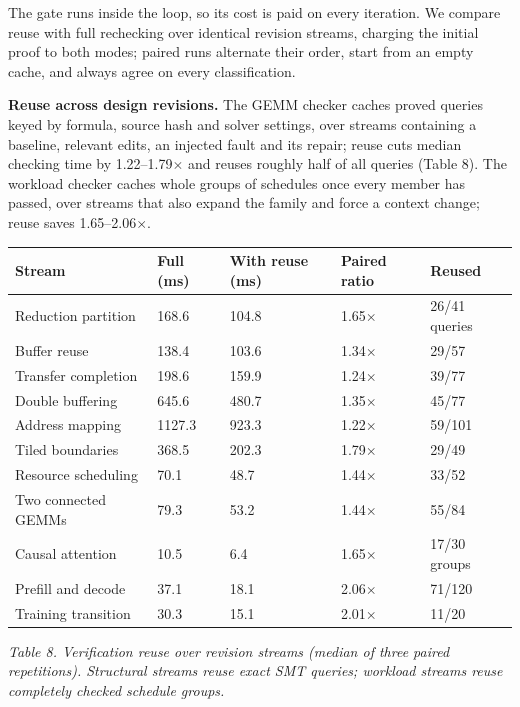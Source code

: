 \documentclass[11pt]{article}
\begin{document}
The gate runs inside the loop, so its cost is paid on every iteration. We compare reuse with full rechecking over identical revision streams, charging the initial proof to both modes; paired runs alternate their order, start from an empty cache, and always agree on every classification.

\textbf{Reuse across design revisions.} The GEMM checker caches proved queries keyed by formula, source hash and solver settings, over streams containing a baseline, relevant edits, an injected fault and its repair; reuse cuts median checking time by 1.22--1.79\ensuremath{\times} and reuses roughly half of all queries (Table 8). The workload checker caches whole groups of schedules once every member has passed, over streams that also expand the family and force a context change; reuse saves 1.65--2.06\ensuremath{\times}.

\begin{longtable}[]{@{}lllll@{}}
\toprule\noalign{}
Stream & Full (ms) & With reuse (ms) & Paired ratio & Reused \\
\midrule\noalign{}
\endhead
\bottomrule\noalign{}
\endlastfoot
Reduction partition & 168.6 & 104.8 & 1.65\(\times\) & 26/41 queries \\
Buffer reuse & 138.4 & 103.6 & 1.34\(\times\) & 29/57 \\
Transfer completion & 198.6 & 159.9 & 1.24\(\times\) & 39/77 \\
Double buffering & 645.6 & 480.7 & 1.35\(\times\) & 45/77 \\
Address mapping & 1127.3 & 923.3 & 1.22\(\times\) & 59/101 \\
Tiled boundaries & 368.5 & 202.3 & 1.79\(\times\) & 29/49 \\
Resource scheduling & 70.1 & 48.7 & 1.44\(\times\) & 33/52 \\
Two connected GEMMs & 79.3 & 53.2 & 1.44\(\times\) & 55/84 \\
Causal attention & 10.5 & 6.4 & 1.65\(\times\) & 17/30 groups \\
Prefill and decode & 37.1 & 18.1 & 2.06\(\times\) & 71/120 \\
Training transition & 30.3 & 15.1 & 2.01\(\times\) & 11/20 \\
\end{longtable}

\emph{Table 8. Verification reuse over revision streams (median of three paired repetitions). Structural streams reuse exact SMT queries; workload streams reuse completely checked schedule groups.}
\end{document}
